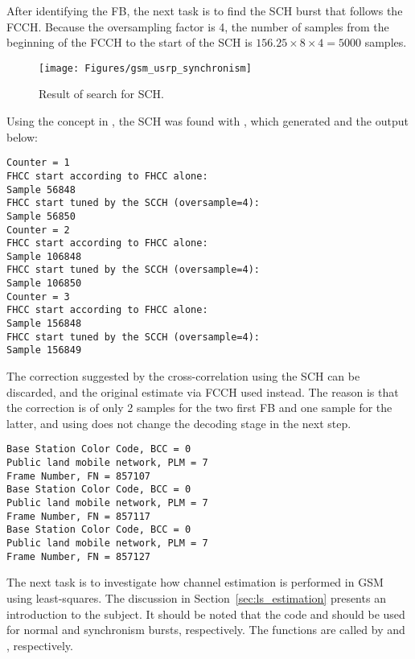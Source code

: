 After identifying the FB, the next task is to find the SCH burst that follows the FCCH. Because the oversampling factor is 4, the number of samples from the beginning of the FCCH to the start of the SCH is $156.25 \times 8 \times 4 = 5000$ samples.

\begin{figure}
\centering
\texttt{[image: Figures/gsm\_usrp\_synchronism]}
\caption{Result of search for SCH.\label{fig:gsm_usrp_synchronism}}
\end{figure}




Using the concept in , the SCH was found with , which generated  and the output below:
\begin{verbatim}
Counter = 1
FHCC start according to FHCC alone:
Sample 56848
FHCC start tuned by the SCCH (oversample=4):
Sample 56850
Counter = 2
FHCC start according to FHCC alone:
Sample 106848
FHCC start tuned by the SCCH (oversample=4):
Sample 106850
Counter = 3
FHCC start according to FHCC alone:
Sample 156848
FHCC start tuned by the SCCH (oversample=4):
Sample 156849
\end{verbatim}

The correction suggested by the cross-correlation
using the SCH can be discarded, and the original estimate via FCCH used instead.
The reason is that the correction is of only 2 samples for the two first FB and one sample for the latter, and using  does not change the decoding stage in the next step.

\begin{verbatim}
Base Station Color Code, BCC = 0
Public land mobile network, PLM = 7
Frame Number, FN = 857107
Base Station Color Code, BCC = 0
Public land mobile network, PLM = 7
Frame Number, FN = 857117
Base Station Color Code, BCC = 0
Public land mobile network, PLM = 7
Frame Number, FN = 857127
\end{verbatim}

The next task is to investigate how channel estimation is performed in GSM using least-squares. The discussion in Section~\ref{sec:ls_estimation} presents an introduction to the subject. It should be noted that the code  and  should be used for normal and synchronism bursts, respectively. The functions are called by  and , respectively.

